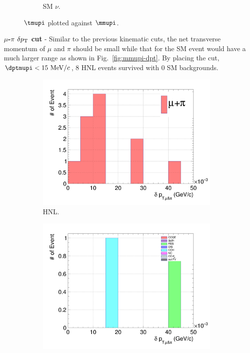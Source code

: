 \begin{figure}[!htb]
\begin{subfigure}{0.45\textwidth}
                \caption{SM $\nu$.}
                \label{fig:sm-mmupi}
           \end{subfigure}
           \caption{$\tmupi$ plotted against $\mmupi$.}
           \label{fig:mmupi-mupiang}
        \end{figure}

        \textbf{$\mu$-$\pi$ $\delta p_\textrm{T}$ cut} - Similar to the previous kinematic cuts, the net transverse momentum of $\mu$ and $\pi$ should be small while that for the SM event would have a much larger range as shown in Fig.~\ref{fig:mmupi-dpt}. By placing the cut, $\dptmupi<15~\mevc$, $8$ HNL events survived with $0$ SM backgrounds.
        
        \begin{figure}[!htb]
           \centering
           \begin{subfigure}{0.45\textwidth}
                \includegraphics[width=\textwidth]{figures/hnl_sfgmu_mpdpt_stack_al9_300_aftmupikin.png}
                \caption{HNL.}
                \label{fig:hnl-mupidpt}
           \end{subfigure}
           \begin{subfigure}{0.45\textwidth}
                \includegraphics[width=\textwidth]{figures/hnl_sfgmu_mpdpt_stack_al9_SM_aftmupikin.png}

\end{subfigure}
\end{figure}
